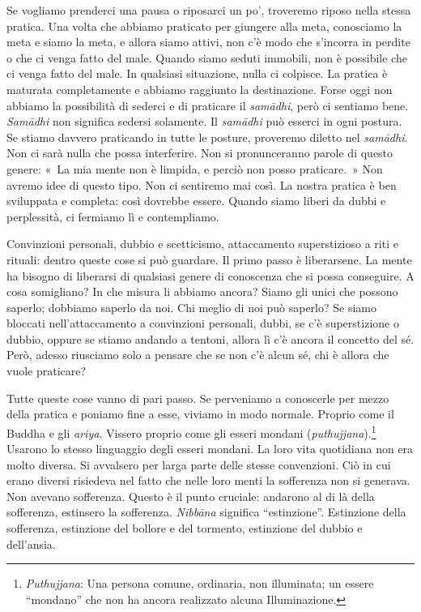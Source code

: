 Se vogliamo prenderci una pausa o riposarci un po', troveremo riposo
nella stessa pratica. Una volta che abbiamo praticato per giungere alla
meta, conosciamo la meta e siamo la meta, e allora siamo attivi, non c'è
modo che s'incorra in perdite o che ci venga fatto del male. Quando
siamo seduti immobili, non è possibile che ci venga fatto del male. In
qualsiasi situazione, nulla ci colpisce. La pratica è maturata
completamente e abbiamo raggiunto la destinazione. Forse oggi non
abbiamo la possibilità di sederci e di praticare il \emph{samādhi}, però
ci sentiamo bene. \emph{Samādhi} non significa sedersi solamente. Il
\emph{samādhi} può esserci in ogni postura. Se stiamo davvero praticando
in tutte le posture, proveremo diletto nel \emph{samādhi}. Non ci sarà
nulla che possa interferire. Non si pronunceranno parole di questo
genere: «~La mia mente non è limpida, e perciò non posso praticare.~»
Non avremo idee di questo tipo. Non ci sentiremo mai così. La nostra
pratica è ben sviluppata e completa: così dovrebbe essere. Quando siamo
liberi da dubbi e perplessità, ci fermiamo lì e contempliamo.

Convinzioni personali, dubbio e scetticismo, attaccamento superstizioso
a riti e rituali: dentro queste cose si può guardare. Il primo passo è
liberarsene. La mente ha bisogno di liberarsi di qualsiasi genere di
conoscenza che si possa conseguire. A cosa somigliano? In che misura li
abbiamo ancora? Siamo gli unici che possono saperlo; dobbiamo saperlo da
noi. Chi meglio di noi può saperlo? Se siamo bloccati nell'attaccamento
a convinzioni personali, dubbi, se c'è superstizione o dubbio, oppure se
stiamo andando a tentoni, allora lì c'è ancora il concetto del sé. Però,
adesso riusciamo solo a pensare che se non c'è alcun sé, chi è allora
che vuole praticare?

Tutte queste cose vanno di pari passo. Se perveniamo a conoscerle per
mezzo della pratica e poniamo fine a esse, viviamo in modo normale.
Proprio come il Buddha e gli \emph{ariya}. Vissero proprio come gli
esseri mondani (\emph{puthujjana}).\footnote{\emph{Puthujjana}: Una
  persona comune, ordinaria, non illuminata; un essere ``mondano'' che
  non ha ancora realizzato alcuna Illuminazione.} Usarono lo stesso
linguaggio degli esseri mondani. La loro vita quotidiana non era molto
diversa. Si avvalsero per larga parte delle stesse convenzioni. Ciò in
cui erano diversi risiedeva nel fatto che nelle loro menti la sofferenza
non si generava. Non avevano sofferenza. Questo è il punto cruciale:
andarono al di là della sofferenza, estinsero la sofferenza.
\emph{Nibbāna} significa ``estinzione''. Estinzione della sofferenza,
estinzione del bollore e del tormento, estinzione del dubbio e
dell'ansia.


